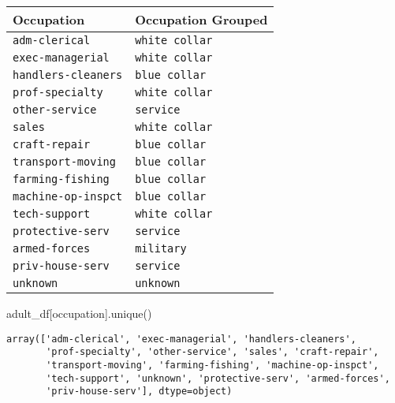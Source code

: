 \documentclass[
  letterpaper,
  DIV=11,
  numbers=noendperiod]{scrartcl}
\newenvironment{Shaded}{\begin{snugshade}}{\end{snugshade}}
\newcommand{\NormalTok}[1]{\textcolor[rgb]{0.00,0.23,0.31}{#1}}
\newcommand{\StringTok}[1]{\textcolor[rgb]{0.13,0.47,0.30}{#1}}
\begin{document}
\begin{longtable}[]{@{}ll@{}}
\toprule\noalign{}
Occupation & Occupation Grouped \\
\midrule\noalign{}
\endhead
\bottomrule\noalign{}
\endlastfoot
\texttt{adm-clerical} & \texttt{white\ collar} \\
\texttt{exec-managerial} & \texttt{white\ collar} \\
\texttt{handlers-cleaners} & \texttt{blue\ collar} \\
\texttt{prof-specialty} & \texttt{white\ collar} \\
\texttt{other-service} & \texttt{service} \\
\texttt{sales} & \texttt{white\ collar} \\
\texttt{craft-repair} & \texttt{blue\ collar} \\
\texttt{transport-moving} & \texttt{blue\ collar} \\
\texttt{farming-fishing} & \texttt{blue\ collar} \\
\texttt{machine-op-inspct} & \texttt{blue\ collar} \\
\texttt{tech-support} & \texttt{white\ collar} \\
\texttt{protective-serv} & \texttt{service} \\
\texttt{armed-forces} & \texttt{military} \\
\texttt{priv-house-serv} & \texttt{service} \\
\texttt{unknown} & \texttt{unknown} \\
\end{longtable}

\begin{Shaded}
\begin{Highlighting}[]
\NormalTok{adult\_df[}\StringTok{\textquotesingle{}occupation\textquotesingle{}}\NormalTok{].unique()}
\end{Highlighting}
\end{Shaded}

\begin{verbatim}
array(['adm-clerical', 'exec-managerial', 'handlers-cleaners',
       'prof-specialty', 'other-service', 'sales', 'craft-repair',
       'transport-moving', 'farming-fishing', 'machine-op-inspct',
       'tech-support', 'unknown', 'protective-serv', 'armed-forces',
       'priv-house-serv'], dtype=object)
\end{verbatim}
\end{document}
